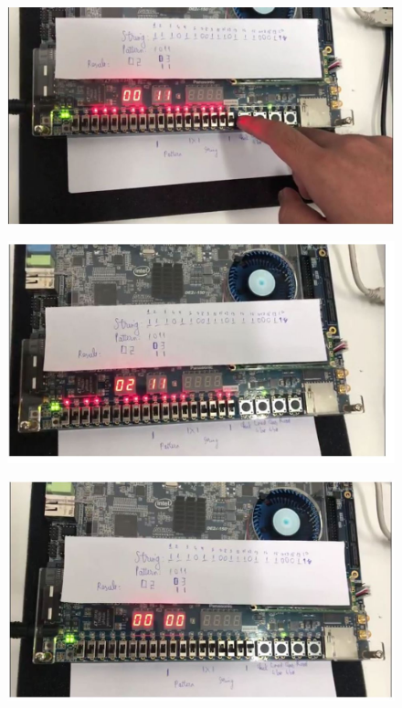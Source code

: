 \documentclass[a4paper]{article}
\begin{document}
	\begin{center}
	\begin{figure}[H]
		\begin{center}
			\includegraphics[scale=.5] {k1.jpg}
		\end{center}
	\end{figure}
	\end{center}  
	
	\begin{center}
	\begin{figure}[H]
		\begin{center}
			\includegraphics[scale=.5] {k3.jpg}
		\end{center}
	\end{figure}
	\end{center}  
\begin{center}
	\begin{figure}[H]
		\begin{center}
			\includegraphics[scale=.5] {k9.jpg}
		\end{center}
	\end{figure}
	\end{center}  	
	
\end{document}

